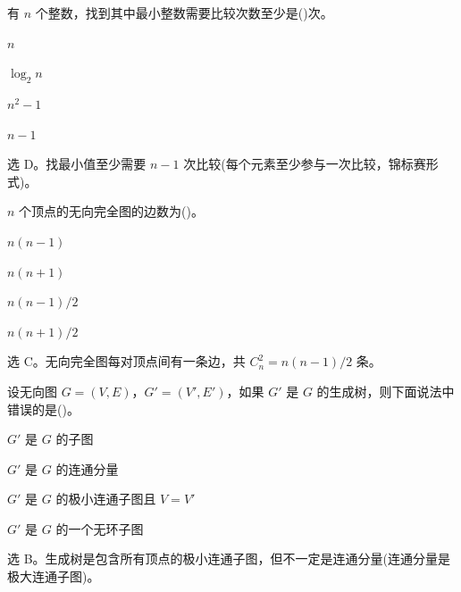 \begin{question}
有 $n$ 个整数，找到其中最小整数需要比较次数至少是(\quad)次。
\begin{choiceoptions}[2]
  \item $n$
  \item $\log_2 n$
  \item $n^2-1$
  \item $n-1$
\end{choiceoptions}
\begin{solution}
选 D。找最小值至少需要 $n-1$ 次比较(每个元素至少参与一次比较，锦标赛形式)。
\end{solution}
\end{question}

\begin{question}
$n$ 个顶点的无向完全图的边数为(\quad)。
\begin{choiceoptions}[2]
  \item $n(n-1)$
  \item $n(n+1)$
  \item $n(n-1)/2$
  \item $n(n+1)/2$
\end{choiceoptions}
\begin{solution}
选 C。无向完全图每对顶点间有一条边，共 $C_n^2 = n(n-1)/2$ 条。
\end{solution}
\end{question}

\begin{question}
设无向图 $G=(V,E)$，$G'=(V',E')$，如果 $G'$ 是 $G$ 的生成树，则下面说法中错误的是(\quad)。
\begin{choiceoptions}[2]
  \item $G'$ 是 $G$ 的子图
  \item $G'$ 是 $G$ 的连通分量
  \item $G'$ 是 $G$ 的极小连通子图且 $V=V'$
  \item $G'$ 是 $G$ 的一个无环子图
\end{choiceoptions}
\begin{solution}
选 B。生成树是包含所有顶点的极小连通子图，但不一定是连通分量(连通分量是极大连通子图)。
\end{solution}
\end{question}

